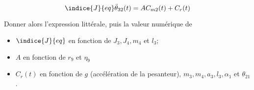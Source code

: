 \else
\fi


$$
\indice{J}{eq} \ddot{\theta}_{32}(t)=A C_{m 2}(t)+C_{r}(t)
$$

Donner alors l'expression littérale, puis la valeur numérique de

\begin{itemize}
  \item $\indice{J}{eq}$ en fonction de $J_{3}, J_{4}, m_{4}$ et $l_{3}$;
  \item $A$ en fonction de $r_{9}$ et $\eta_{9}$
  \item $C_{r}(t)$ en fonction de $g$ (accélération de la pesanteur), $m_{3}, m_{4}, a_{3}, l_{3}, \alpha_{1}$ et $\theta_{21}$.
\end{itemize}

